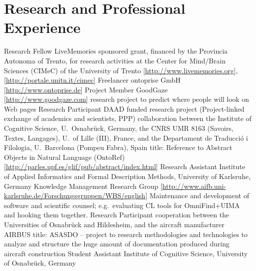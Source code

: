 \documentclass[11pt,a4paper]{moderncv}
\begin{document}
\pagebreak

\section{Research and Professional Experience}
        {Research Fellow}
        {LiveMemories sponsored grant, financed by the Provincia Autonoma of Trento, for research activities at the Center for Mind/Brain Sciences (CIMeC) of the University of Trento [\url{http://www.livememories.org}],[\url{http://portale.unitn.it/cimec}]}
        {}{}{}
        {Freelancer}
        {ontoprise GmbH [\url{http://www.ontoprise.de}]}
        {}{}{}
        {Project Member}
        {GoodGaze [\url{http://www.goodgaze.com}]}
        {\small research project to predict where people will look on Web pages}
        {}{}
        {Research Participant}
        {DAAD funded research project (Project-linked exchange of academics and scientists, PPP)}
        {\small collaboration between the Institute of Cognitive Science, U.~Osnabr\"{u}ck, Germany, the CNRS UMR 8163 (Savoirs, Textes, Langages), U.~of Lille (III), France, and the Departament de Traducci\'{o} i Filologia, U.~Barcelona (Pompeu Fabra), Spain}
        {\small title: Reference to Abstract Objects in Natural Language (OntoRef) [\url{http://parles.upf.es/glif/pub/abstract/index.html}]}
        {}
        {Research Assistant}
        {Institute of Applied Informatics and Formal Description Methods, University of Karlsruhe, Germany}
        {\small Knowledge Management Research Group}
        {[\url{http://www.aifb.uni-karlsruhe.de/Forschungsgruppen/WBS/english}]}
        {Maintenance and development of software and scientific counsel; e.g.~evaluating CL tools for OmniFind+UIMA and hooking them together.}
        {Research Participant}
        {cooperation between the Universities of Osnabr\"{u}ck and Hildesheim, and the aircraft manufacturer AIRBUS}
        {\small title: ASASDO -- project to research methodologies and technologies to analyze and structure the huge amount of documentation produced during aircraft construction}
        {}{}
        {Student Assistant}
        {Institute of Cognitive Science, University of Osnabr\"{u}ck, Germany}
\end{document}
